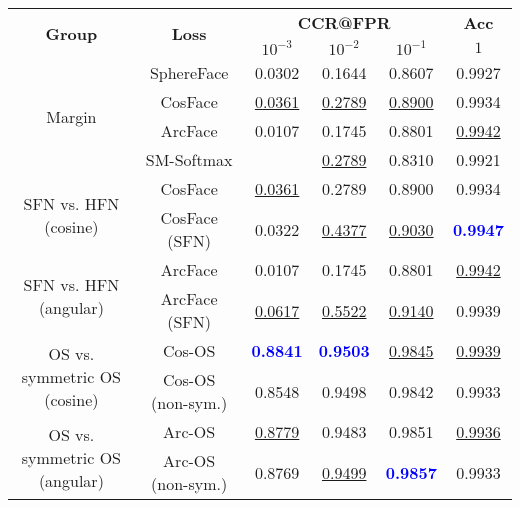 \begin{tabularx}{.7\textwidth}{|c|c||ccc|c|}
\hline
\multirow{2}{*}{\bf Group} & \multirow{2}{*}{\bf Loss} & \multicolumn{3}{c|}{\bf CCR@FPR} & \bf {Acc} \\ \cline{3-6}
& &$10^{-3}$ & $10^{-2}$ & $10^{-1}$ & $1$\\\hline\hline
\multirow{4}{*}{Margin} & SphereFace & 0.0302 & 0.1644 & 0.8607 & 0.9927\\
 & CosFace & \underline {0.0361} & \underline {0.2789} & \underline {0.8900} & 0.9934\\
 & ArcFace & 0.0107 & 0.1745 & 0.8801 & \underline {0.9942}\\
 & SM-Softmax & & \underline {0.2789} & 0.8310 & 0.9921\\
\hline
\multirow{2}{*}{SFN vs. HFN (cosine)} & CosFace & \underline {0.0361} & 0.2789 & 0.8900 & 0.9934\\
 & CosFace (SFN) & 0.0322 & \underline {0.4377} & \underline {0.9030} & \textcolor{blue}{\bf 0.9947}\\
\hline
\multirow{2}{*}{SFN vs. HFN (angular)} & ArcFace & 0.0107 & 0.1745 & 0.8801 & \underline {0.9942}\\
 & ArcFace (SFN) & \underline {0.0617} & \underline {0.5522} & \underline {0.9140} & 0.9939\\
\hline
\multirow{2}{*}{OS vs. symmetric OS (cosine)} & Cos-OS & \textcolor{blue}{\bf 0.8841} & \textcolor{blue}{\bf 0.9503} & \underline {0.9845} & \underline {0.9939}\\
 & Cos-OS (non-sym.) & 0.8548 & 0.9498 & 0.9842 & 0.9933\\
\hline
\multirow{2}{*}{OS vs. symmetric OS (angular)} & Arc-OS & \underline {0.8779} & 0.9483 & 0.9851 & \underline {0.9936}\\
 & Arc-OS (non-sym.) & 0.8769 & \underline {0.9499} & \textcolor{blue}{\bf 0.9857} & 0.9933\\
\hline
\end{tabularx}
